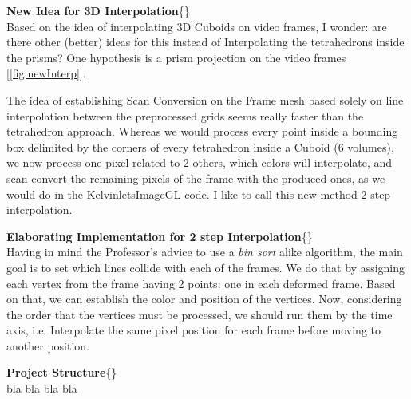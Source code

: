 \documentclass[14pt]{book}
\newenvironment{loggentry}[2]%
{\noindent\textbf{#2}\newline\{\marginnote{#1}\}\newline\\}{\vspace{1.0cm}}
\begin{document}
\begin{loggentry}{28-05-2019}{New Idea for 3D Interpolation}
	Based on the idea of interpolating 3D Cuboids on video frames, I wonder: are there other (better) ideas for this instead of Interpolating the tetrahedrons inside the prisms? One hypothesis is a prism projection on the video frames [\ref{fig:newInterp}].	

	The idea of establishing Scan Conversion on the Frame mesh based solely on line interpolation between the preprocessed grids seems really faster than the tetrahedron approach. Whereas we would process every point inside a bounding box delimited by the corners of every tetrahedron inside a Cuboid (6 volumes), we now process one pixel related to 2 others, which colors will interpolate, and scan convert the remaining pixels of the frame with the produced ones, as we would do in the KelvinletsImageGL code. I like to call this new method 2 step interpolation.  
\end{loggentry}

\begin{loggentry}{30-05-2019}{Elaborating Implementation for 2 step Interpolation}
		Having in mind the Professor's advice to use a \textit{bin sort} alike algorithm, the main goal is to set which lines collide with each of the frames. We do that by assigning each vertex from the frame having 2 points: one in each deformed frame. Based on that, we can establish the color and position of the vertices. Now, considering the order that the vertices must be processed, we should run them by the time axis, i.e. Interpolate the same pixel position for each frame before moving to another position.    
\end{loggentry}

\begin{loggentry}{01-06-2019}{Project Structure}
	bla bla bla bla
\end{loggentry}
\end{document}
